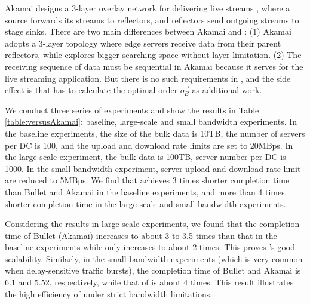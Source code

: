Akamai designs a 3-layer overlay network for delivering live streams \cite{Andreev2013Designing}, where a source forwards its streams to reflectors, and reflectors send outgoing streams to stage sinks. There are two main differences between Akamai and \name: (1) Akamai adopts a 3-layer topology where edge servers receive data from their parent reflectors, while \name explores bigger searching space without layer limitation. (2) The receiving sequence of data must be sequential in Akamai because it serves for the live streaming application. But there is no such requirements in \name, and the side effect is that \name has to calculate the optimal order $\overrightarrow{o_B}$ as additional work.

We conduct three series of experiments and show the results in Table \ref{table:versusAkamai}: baseline, large-scale and small bandwidth experiments. In the baseline experiments, the size of the bulk data is 10TB, the number of servers per DC is 100, and the upload and download rate limits are set to 20MBps. In the large-scale experiment, the bulk data is 100TB, server number per DC is 1000. In the small bandwidth experiment, server upload and download rate limit are reduced to 5MBps. We find that \name achieves 3 times shorter completion time than Bullet and Akamai in the baseline experiments, and more than 4 times shorter completion time in the large-scale and small bandwidth experiments.

Considering the results in large-scale experiments, we found that the completion time of Bullet (Akamai) increases to about 3 to 3.5 times than that in the baseline experiments while \name only increases to about 2 times. This proves \name's good scalability. Similarly, in the small bandwidth experiments (which is very common when delay-sensitive traffic bursts), the completion time of Bullet and Akamai is 6.1 and 5.52, respectively, while that of \name is about 4 times. This result illustrates the high efficiency of \name under strict bandwidth limitations.

